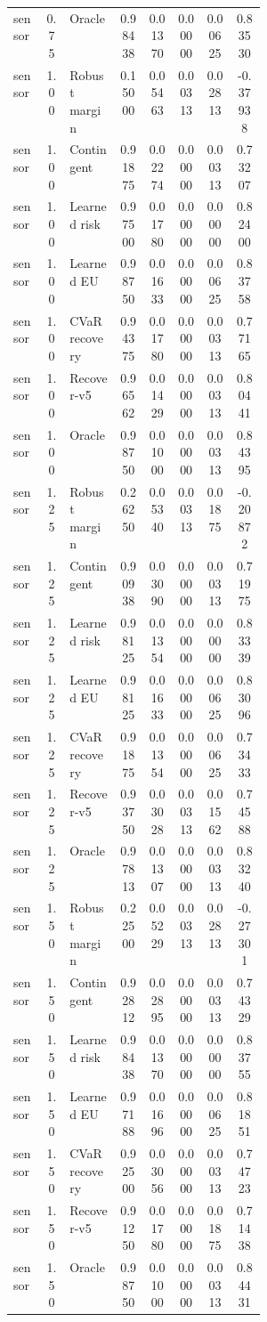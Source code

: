 \documentclass{article}
\begin{document}
\begin{center}
\begin{longtable}{p{0.13\linewidth}cp{0.20\linewidth}ccccc}
sensor & 0.75 & Oracle & 0.98438 & 0.01370 & 0.00000 & 0.00625 & 0.83530\\
sensor & 1.00 & Robust margin & 0.15000 & 0.05463 & 0.00313 & 0.02813 & -0.37938\\
sensor & 1.00 & Contingent & 0.91875 & 0.02274 & 0.00000 & 0.00313 & 0.73207\\
sensor & 1.00 & Learned risk & 0.97500 & 0.01780 & 0.00000 & 0.00000 & 0.82400\\
sensor & 1.00 & Learned EU & 0.98750 & 0.01633 & 0.00000 & 0.00625 & 0.83758\\
sensor & 1.00 & CVaR recovery & 0.94375 & 0.01780 & 0.00000 & 0.00313 & 0.77165\\
sensor & 1.00 & Recover-v5 & 0.96562 & 0.01429 & 0.00000 & 0.00313 & 0.80441\\
sensor & 1.00 & Oracle & 0.98750 & 0.01000 & 0.00000 & 0.00313 & 0.84395\\
sensor & 1.25 & Robust margin & 0.26250 & 0.05340 & 0.00313 & 0.01875 & -0.20872\\
sensor & 1.25 & Contingent & 0.90938 & 0.03090 & 0.00000 & 0.00313 & 0.71975\\
sensor & 1.25 & Learned risk & 0.98125 & 0.01354 & 0.00000 & 0.00000 & 0.83339\\
sensor & 1.25 & Learned EU & 0.98125 & 0.01633 & 0.00000 & 0.00625 & 0.83096\\
sensor & 1.25 & CVaR recovery & 0.91875 & 0.01354 & 0.00000 & 0.00625 & 0.73433\\
sensor & 1.25 & Recover-v5 & 0.93750 & 0.03028 & 0.00313 & 0.01562 & 0.74588\\
sensor & 1.25 & Oracle & 0.97813 & 0.01307 & 0.00000 & 0.00313 & 0.83240\\
sensor & 1.50 & Robust margin & 0.22500 & 0.05229 & 0.00313 & 0.02813 & -0.27301\\
sensor & 1.50 & Contingent & 0.92812 & 0.02895 & 0.00000 & 0.00313 & 0.74329\\
sensor & 1.50 & Learned risk & 0.98438 & 0.01370 & 0.00000 & 0.00000 & 0.83755\\
sensor & 1.50 & Learned EU & 0.97188 & 0.01696 & 0.00000 & 0.00625 & 0.81851\\
sensor & 1.50 & CVaR recovery & 0.92500 & 0.03056 & 0.00000 & 0.00313 & 0.74723\\
sensor & 1.50 & Recover-v5 & 0.91250 & 0.01780 & 0.00000 & 0.01875 & 0.71438\\
sensor & 1.50 & Oracle & 0.98750 & 0.01000 & 0.00000 & 0.00313 & 0.84431\\

\end{longtable}
\end{center}
\end{document}
